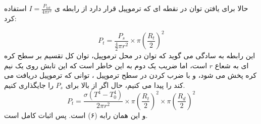 \documentclass{article}
\begin{document}
حالا برای یافتن توان در  نقطه ای که ترموپیل قرار دارد از رابطه ی 
$I = \frac{P_{tot}}{4\pi r^2}$
استفاده کرد:

\[
P_{t} = \frac{P_s}{\frac42\pi r^2} \times \pi (\frac{R_t}{2})^2
\]
این رابطه به سادگی می گوید که توان در محل ترموپیل، توان کل تقسیم بر سطح کره ای به شعاع 
$r$
 است، اما ضریب یک دوم به این خاطر است که این تابش روی یک نیم کره پخش می شود، و با ضرب کردن در سطح ترموپیل ، توانی که ترموپیل دریافت می کند را پیدا می کنیم، حال اگر از بالا برای 
 $P_s$
 را جایگذاری کنیم.
 \[
 P_t = \frac{\sigma(T^4 - T_0^4)}{2\pi r^2} \times \pi (\frac{R_t}{2})^2 \times \pi (\frac{R_d}{2})^2
 \]
و این همان رابه (۶) است. پس اثبات کامل است.
\end{document}
